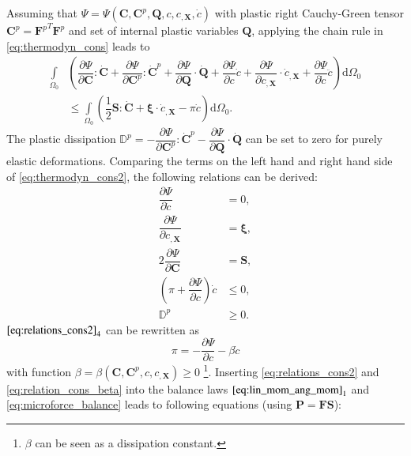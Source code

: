 Assuming that $\Psi=\Psi\left(\mathbf{C},\mathbf{C}^{p},\mathbf{Q},c,c_{,\mathbf{X}},\dot{c}\right)$ with plastic right Cauchy-Green tensor $\mathbf{C}^{p}={\mathbf{F}^{p}}^{T}\mathbf{F}^{p}$ and set of internal plastic variables $\mathbf{Q}$, applying the chain rule in \eqref{eq:thermodyn_cons} leads to
\begin{equation} \label{eq:thermodyn_cons2}
	\begin{aligned}
	\int\limits_{\Omega_{0}}&\left(\dfrac{\partial\Psi}{\partial\mathbf{C}}:\dot{\mathbf{C}}+\dfrac{\partial\Psi}{\partial\mathbf{C}^{p}}:\dot{\mathbf{C}}^{p}+\dfrac{\partial\Psi}{\partial\mathbf{Q}}\cdot\dot{\mathbf{Q}}+\dfrac{\partial\Psi}{\partial c}\dot{c}+\dfrac{\partial\Psi}{\partial c_{,\mathbf{X}}}\cdot\dot{c}_{,\mathbf{X}}+\dfrac{\partial\Psi}{\partial\dot{c}}\ddot{c}\right)\mathrm{d}\Omega_{0} \\
	&\leq \int\limits_{\Omega_{0}}\left(\dfrac{1}{2}\mathbf{S}:\dot{\mathbf{C}}+\bm{\xi}\cdot\dot{c}_{,\mathbf{X}}-\pi\dot{c}\right)\mathrm{d}\Omega_{0}.
	\end{aligned}
\end{equation}
The plastic dissipation $\mathbb{D}^{p}=-\dfrac{\partial\Psi}{\partial\mathbf{C}^{p}}:\dot{\mathbf{C}}^{p}-\dfrac{\partial\Psi}{\partial\mathbf{Q}}\cdot\dot{\mathbf{Q}}$ can be set to zero for purely elastic deformations. Comparing the terms on the left hand and right hand side of \eqref{eq:thermodyn_cons2}, the following relations can be derived:
\begin{equation} \label{eq:relations_cons2}
	\begin{aligned}
		\dfrac{\partial\Psi}{\partial\dot{c}} &= 0, \\
		\dfrac{\partial\Psi}{\partial c_{,\mathbf{X}}} &= \bm{\xi}, \\
		2\dfrac{\partial\Psi}{\partial\mathbf{C}} &= \mathbf{S}, \\
		\left(\pi+\dfrac{\partial\Psi}{\partial c}\right)\dot{c} &\leq 0, \\
		\mathbb{D}^{p} &\geq 0.
	\end{aligned}
\end{equation}
$\eqref{eq:relations_cons2}_{4}$ can be rewritten as
\begin{equation} \label{eq:relation_cons_beta}
	\pi = -\dfrac{\partial\Psi}{\partial c}-\beta\dot{c}
\end{equation}
with function $\beta=\beta\left(\mathbf{C},\mathbf{C}^{p},c,c_{,\mathbf{X}}\right)\geq0$ \footnote{$\beta$ can be seen as a dissipation constant.}. Inserting \eqref{eq:relations_cons2} and \eqref{eq:relation_cons_beta} into the balance laws $\eqref{eq:lin_mom_ang_mom}_{1}$ and \eqref{eq:microforce_balance} leads to following equations (using $\mathbf{P}=\mathbf{F}\mathbf{S}$):

